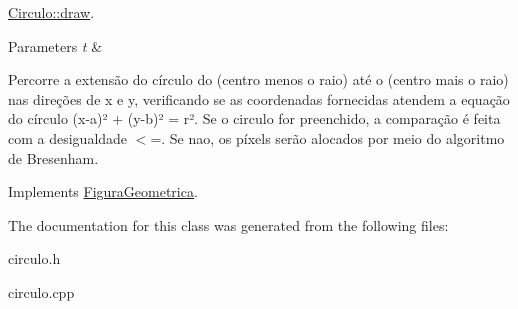 \mbox{\hyperlink{class_circulo_a593787d6e0618c2eded23e8839e7bea6}{Circulo\+::draw}}. 


\begin{DoxyParams}{Parameters}
{\em t} & \\
\hline
\end{DoxyParams}
Percorre a extensão do círculo do (centro menos o raio) até o (centro mais o raio) nas direções de x e y, verificando se as coordenadas fornecidas atendem a equação do círculo (x-\/a)² + (y-\/b)² = r². Se o circulo for preenchido, a comparação é feita com a desigualdade $<$=. Se nao, os píxels serão alocados por meio do algoritmo de Bresenham. 

Implements \mbox{\hyperlink{class_figura_geometrica}{Figura\+Geometrica}}.



The documentation for this class was generated from the following files\+:\begin{DoxyCompactItemize}
\item 
circulo.\+h\item 
circulo.\+cpp\end{DoxyCompactItemize}
